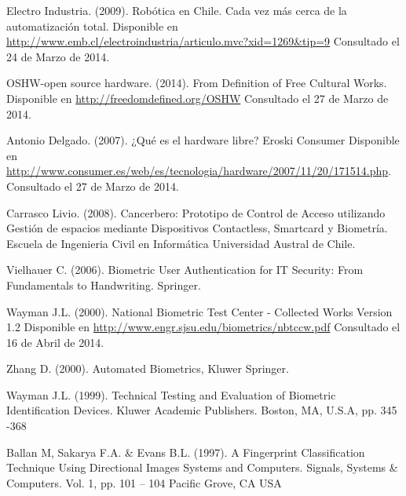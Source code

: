 
\begin{spacing}{1.0}
\begin{thebibliography}{99}  

Electro Industria. (2009).
\newblock Robótica en Chile. Cada vez más cerca de la automatización total.
\newblock Disponible en \url{http://www.emb.cl/electroindustria/articulo.mvc?xid=1269&tip=9}
\newblock Consultado el 24 de Marzo de 2014.

OSHW-open source hardware. (2014).
\newblock From Definition of Free Cultural Works.
\newblock Disponible en \url{http://freedomdefined.org/OSHW}
\newblock Consultado el 27 de Marzo de 2014.

Antonio Delgado. (2007).
\newblock ¿Qué es el hardware libre?
\newblock Eroski Consumer
\newblock Disponible en \url{http://www.consumer.es/web/es/tecnologia/hardware/2007/11/20/171514.php}.
\newblock Consultado el 27 de Marzo de 2014.

Carrasco Livio.  (2008).
\newblock Cancerbero: Prototipo de Control de Acceso utilizando Gestión de espacios mediante Dispositivos Contactless, Smartcard y Biometría.
\newblock Escuela de Ingenieria Civil en Informática
\newblock Universidad Austral  de Chile. 

Vielhauer C. (2006).
\newblock Biometric User Authentication for IT Security: From Fundamentals to Handwriting.
\newblock Springer.

Wayman J.L. (2000).
\newblock National Biometric Test Center - Collected Works Version 1.2
\newblock Disponible en \url{http://www.engr.sjsu.edu/biometrics/nbtccw.pdf}
\newblock Consultado el 16 de Abril de 2014.


Zhang D. (2000).
\newblock Automated Biometrics, Kluwer
\newblock Springer.


Wayman J.L. (1999).
\newblock Technical Testing and Evaluation of Biometric Identification Devices.
\newblock Kluwer Academic Publishers.
\newblock Boston, MA, U.S.A, pp. 345 -368

Ballan M, Sakarya F.A. \& Evans B.L. (1997).
\newblock A Fingerprint Classification Technique Using Directional Images Systems and Computers.
\newblock Signals, Systems \& Computers.
\newblock Vol. 1, pp. 101 – 104
\newblock Pacific Grove, CA USA



\end{thebibliography}
\end{spacing}
